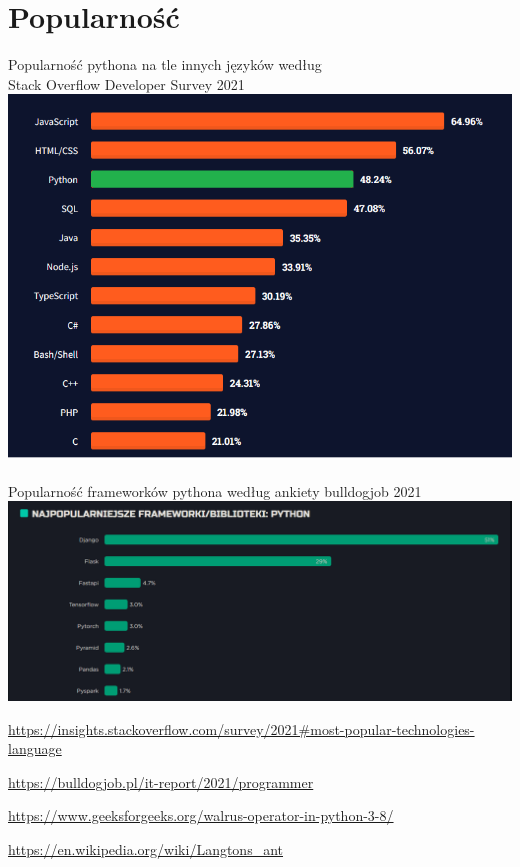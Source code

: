 \documentclass[a4paper, 12pt]{article}
\begin{document}
\section{Popularność}
Popularność pythona na tle innych języków według \\
Stack Overflow Developer Survey 2021\cite{stack}
\\
\includegraphics[width=1.1\textwidth]{stack.png}
\\ \\
Popularność frameworków pythona według ankiety bulldogjob 2021\cite{bull}\\
\includegraphics[width=1.1\textwidth]{bull.png}


\pagebreak


\begin{thebibliography}{9}
\href{https://insights.stackoverflow.com/survey/2021#most-popular-technologies-language}{https://insights.stackoverflow.com/survey/2021#most-popular-technologies-language} 

\href{https://bulldogjob.pl/it-report/2021/programmer}{https://bulldogjob.pl/it-report/2021/programmer} 


\href{https://www.geeksforgeeks.org/walrus-operator-in-python-3-8/}{https://www.geeksforgeeks.org/walrus-operator-in-python-3-8/}

\href{https://en.wikipedia.org/wiki/Langtons_ant}{https://en.wikipedia.org/wiki/Langtons_ant}

\end{thebibliography}
\end{document}
